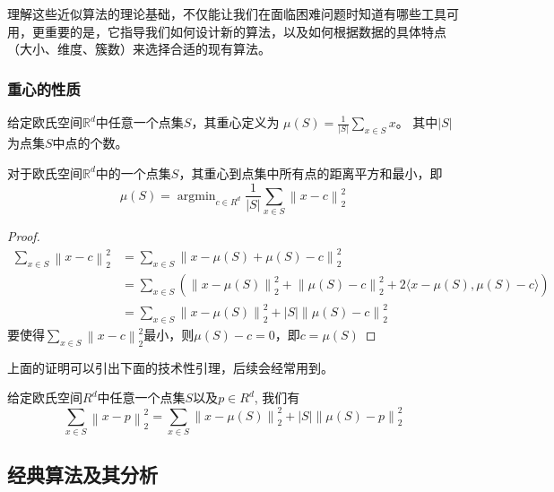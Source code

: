 \documentclass[lang=cn,newtx,10pt,scheme=chinese,chinesefont=nofont,citestyle=gb7714-2015, bibstyle=gb7714-2015]{elegantbook}
\begin{document}
\begin{refsection}
理解这些近似算法的理论基础，不仅能让我们在面临困难问题时知道有哪些工具可用，更重要的是，它指导我们如何设计新的算法，以及如何根据数据的具体特点（大小、维度、簇数）来选择合适的现有算法。

\subsubsection{重心的性质}

\begin{definition}[重心]
    给定欧氏空间$\mathbb{R}^d$中任意一个点集$S$，其重心定义为
    $\mu(S)=\frac{1}{|S|}\sum_{x\in S}x$。
    其中$|S|$为点集$S$中点的个数。
\end{definition}
\begin{theorem}[重心的最优性]
对于欧氏空间$\mathbb{R}^d$中的一个点集$S$，其重心到点集中所有点的距离平方和最小，即
    \[
    \mu(S)=\mathop{argmin}_{c\in R^d}\frac{1}{|S|}\sum_{x\in S}\left\lVert x-c \right\rVert_2^2\]
\end{theorem}
\begin{proof}
\begin{align*}
    \sum_{x\in S}\left\lVert x-c \right\rVert_2^2&=\sum_{x\in S}\left\lVert x-\mu(S) + \mu(S) -c \right\rVert_2^2\\
    &=\sum_{x\in S}(\left\lVert x-\mu(S) \right\rVert_2^2 + \left\lVert \mu(S)-c\right\rVert_2^2 + 2\langle x-\mu(S) , \mu(S)-c\rangle)\\
    &=\sum_{x\in S}\left\lVert x-\mu(S) \right\rVert_2^2+|S|\left\lVert \mu(S)-c \right\rVert_2^2
\end{align*}
要使得$\sum_{x\in S}\left\lVert x-c \right\rVert_2^2$最小，则$\mu(S)-c = 0$，即$c = \mu(S)$
\end{proof}
上面的证明可以引出下面的技术性引理，后续会经常用到。
\begin{lemma}\label{lmm:barycenter}
    给定欧氏空间$R^d$中任意一个点集$S$以及$p\in R^d$,
    我们有$$\sum_{x\in S}\left\lVert x-p \right\rVert_2^2=\sum_{x\in S}\left\lVert x-\mu(S) \right\rVert_2^2+|S|\left\lVert \mu(S)-p \right\rVert_2^2$$
\end{lemma}


\subsection{经典算法及其分析}

\end{refsection}
\end{document}
